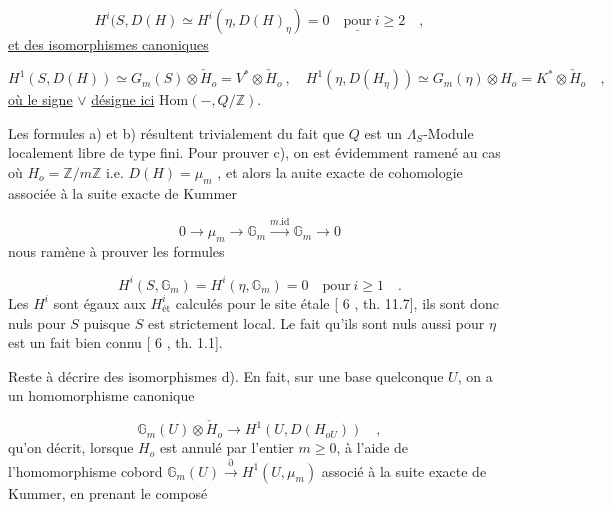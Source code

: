 \begin{equation}\tag{c)}
H^i(S,D(H) \simeq H^i(\eta,D(H)_\eta) = 0 \quad \underline{\text{pour}}\ i \geq 2 \quad ,
\end{equation}
\underline{et des isomorphismes canoniques}

\begin{equation}\tag{d)}
H^1(S,D(H)) \simeq G_m(S)\otimes \check{H}_o = V^*\otimes \check{H}_o \ , \quad H^1(\eta,D(H_\eta)) \simeq G_m(\eta) \otimes H_o = K^*\otimes \check{H}_o \quad ,
\end{equation}
\underline{où le signe} $\vee$ \underline{désigne ici} $\mathrm{Hom}( - , Q/\mathbb{Z} )$.

Les formules a) et b) résultent trivialement du fait que $Q$ est un $\Lambda_S$-Module localement libre de type fini. Pour prouver c), on est évidemment ramené au cas où $H_o = \mathbb{Z}/m\mathbb{Z}$ i.e. $D(H) = \mu_m$ , et alors la auite exacte de cohomologie associée à la suite exacte de Kummer

\begin{equation*}
0 \longrightarrow \mu_m \longrightarrow \mathbb{G}_m \overset{m.\mathrm{id}}{\longrightarrow} \mathbb{G}_m \longrightarrow 0
\end{equation*}
nous ramène à prouver les formules

\begin{equation*}
H^i(S,\mathbb{G}_m) = H^i(\eta,\mathbb{G}_m) = 0 \quad \text{pour}\ i \geq 1 \quad .
\end{equation*}
Les $H^i$ sont égaux aux $H^i_{\text{ét}}$ calculés pour le site étale [ 6 , th. 11.7], ils sont donc nuls pour $S$ puisque $S$ est strictement local. Le fait qu'ils sont nuls aussi pour $\eta$ est un fait bien connu [ 6 , th. 1.1].



Reste à décrire des isomorphismes d). En fait, sur une base quelconque $U$, on a un homomorphisme canonique

\begin{equation}\tag{9.4.3.1}
\mathbb{G}_m(U) \otimes \check{H}_o \longrightarrow H^1(U,D(H_{oU})) \quad ,
\end{equation}
qu'on décrit, lorsque $H_o$ est annulé par l'entier $m \geqslant 0$, à l'aide de l'homomorphisme cobord $\mathbb{G}_m(U) \stackrel{\partial}{\longrightarrow} H^1(U,\mu_m)$ associé à la suite exacte de Kummer, en prenant le composé

